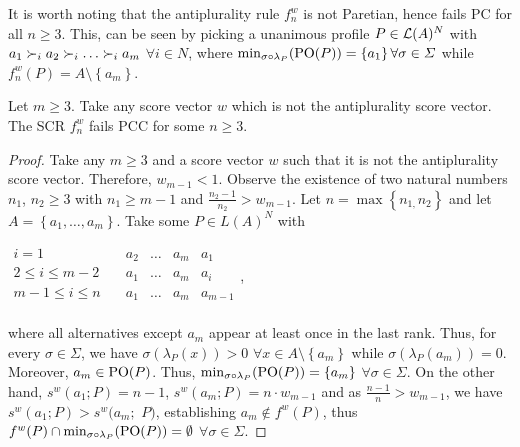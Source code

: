 \documentclass[version=3.21, pagesize, twoside=off, bibliography=totoc, DIV=calc, fontsize=12pt, a4paper]{scrartcl}
\begin{document}
It is worth noting that the antiplurality rule $f_{n}^{w}$ is not Paretian, hence fails PC  for all $n\geq 3$. This, can be seen by picking a unanimous profile $P\in \mathcal{L}(A)^{N}$ with $a_{1}\prefi a_{2}\prefi \dots \prefi a_{m}$ $\forall i\in N$, where $\mustar=\left\{ a_{1}\right\} \forall \sigma \in \Sigma $ while $f_{n}^{w}(P)=A \setminus \left\{ a_{m}\right\}$.

\begin{theorem}
	\label{th:srPCC}
	Let $m\geq 3.$ Take any score vector $w$ which is not the antiplurality score vector. The \ac{SCR} $f_{n}^{w}$ fails PCC for some $n\geq 3$.
\end{theorem}

\begin{proof}
	Take any $m\geq 3$ and a score vector $w$ such that it is not the antiplurality score vector. Therefore, $w_{m-1}<1$. Observe the existence of two natural numbers $n_{1}$, $n_{2}\geq 3$ with $n_{1}\geq m-1$ and $\frac{n_{2}-1}{n_{2}}>w_{m-1}$.
	Let $n=\max \left\{ n_{1,}n_{2}\right\} $ and let $A=\left\{ a_{1}, \dots, a_{m}\right\} $. Take some $P\in L(A)^{N}$ with
	
	\begin{center}
		$
		\begin{array}{cccccc}
		i = 1 \quad & a_2 & … & a_m & a_1\\
		2 ≤ i ≤ m - 2 \quad & a_1 & … & a_m & a_i\\
		m - 1 ≤ i ≤ n \quad & a_1 & … & a_m & a_{m-1}\\
		\end{array}
		$,
	\end{center}
	where all alternatives except $a_m$ appear at least once in the last rank.
	Thus, for every $\sigma \in \Sigma$, we have 
	$\sigma (\lambda _{P}(x))>0$ $\forall x\in A \setminus \left\{ a_{m}\right\}$
	while
	$\sigma (\lambda_{P}(a_{m}))=0$. 
	Moreover, $a_{m}\in \text{PO}(P)$. Thus, $\mustar=\left\{ a_{m}\right\} $ $\forall \sigma \in \Sigma $. On the
	other hand, $s^{w}(a_{1}; P)=n-1$, $s^{w}(a_{m}; P)=n\cdot w_{m-1}$ and
	as $\frac{n-1}{n}>w_{m-1}$, we have $s^{w}(a_{1}; P)>s^{w}(a_{m};$ $P)$,
	establishing $a_{m}\notin f^{w}(P)$, thus $f^{w}(P)\cap \mustar=\emptyset $ $\forall \sigma \in \Sigma $.
\end{proof}
\end{document}
